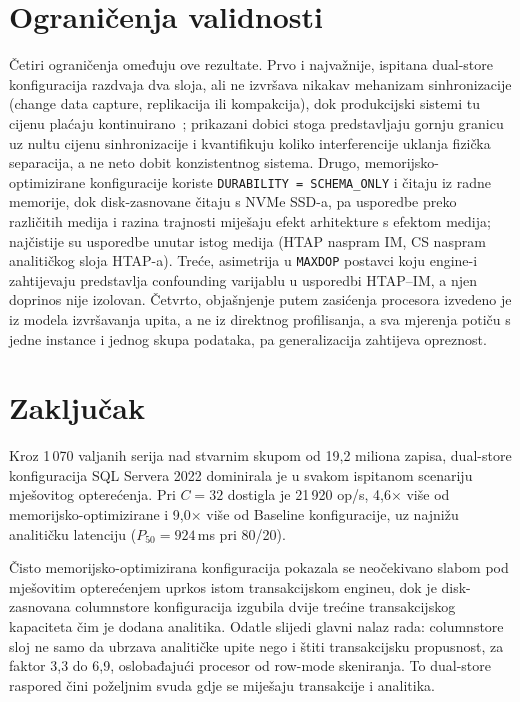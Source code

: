 \documentclass[10pt,conference,a4paper]{IEEEtran}
\begin{document}
\section{Ograničenja validnosti}
\label{sec:threats}
Četiri ograničenja omeđuju ove rezultate. Prvo i najvažnije, ispitana
dual-store konfiguracija razdvaja dva sloja, ali ne izvršava
nikakav mehanizam sinhronizacije (change data capture, replikacija ili
kompakcija), dok produkcijski sistemi tu cijenu plaćaju
kontinuirano~\cite{huang2020, yang2020}; prikazani dobici stoga predstavljaju gornju
granicu uz nultu cijenu sinhronizacije i kvantifikuju koliko interferencije
uklanja fizička separacija, a ne neto dobit konzistentnog sistema. Drugo, memorijsko-optimizirane konfiguracije koriste
\texttt{DURABILITY = SCHEMA\_ONLY} i čitaju iz radne memorije, dok
disk-zasnovane čitaju s NVMe SSD-a, pa usporedbe preko različitih medija i
razina trajnosti miješaju efekt arhitekture s efektom medija; najčistije su
usporedbe unutar istog medija (HTAP naspram IM, CS naspram analitičkog sloja
HTAP-a). Treće, asimetrija u \texttt{MAXDOP} postavci koju engine-i zahtijevaju
predstavlja confounding varijablu u usporedbi HTAP--IM, a njen doprinos nije
izolovan. Četvrto, objašnjenje putem zasićenja procesora
izvedeno je iz modela izvršavanja upita, a ne iz direktnog profilisanja, a sva
mjerenja potiču s jedne instance i jednog skupa podataka, pa generalizacija
zahtijeva opreznost.

\section{Zaključak}
Kroz 1\,070 valjanih serija nad stvarnim skupom od 19,2 miliona zapisa,
dual-store konfiguracija SQL Servera 2022 dominirala je u svakom ispitanom
scenariju mješovitog opterećenja. Pri $C = 32$ dostigla je 21\,920 op/s,
4,6$\times$ više od memorijsko-optimizirane i 9,0$\times$ više od Baseline
konfiguracije, uz najnižu analitičku latenciju ($P_{50} = 924$\,ms pri
80/20).

Čisto memorijsko-optimizirana konfiguracija pokazala se neočekivano slabom pod
mješovitim opterećenjem uprkos istom transakcijskom engineu, dok je
disk-zasnovana columnstore konfiguracija izgubila dvije trećine transakcijskog
kapaciteta čim je dodana analitika. Odatle slijedi glavni nalaz rada:
columnstore sloj ne samo da ubrzava analitičke upite nego i štiti transakcijsku
propusnost, za faktor 3,3 do 6,9, oslobađajući procesor od row-mode
skeniranja. To dual-store raspored čini poželjnim svuda gdje se miješaju
transakcije i analitika.
\end{document}
